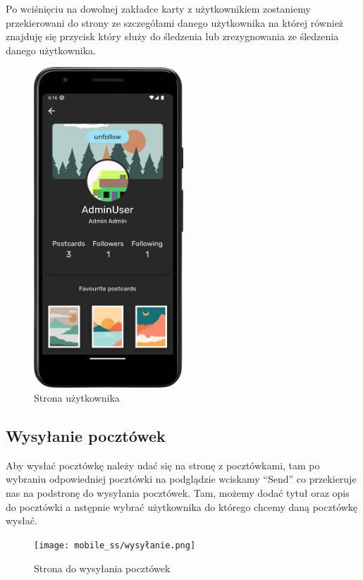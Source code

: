 \documentclass[a4paper,twoside,12pt]{book}
\begin{document}
Po wciśnięciu na dowolnej zakładce karty z użytkownikiem zostaniemy przekierowani do strony ze szczegółami danego użytkownika na której również znajduję się przycisk który służy do śledzenia lub zrezygnowania ze śledzenia danego użytkownika. 

\begin{figure}[H]
    \centering
    \includegraphics[width=0.5\textwidth]{mobile_ss/friend.png}
    \caption{Strona użytkownika}
\end{figure}

\subsection{Wysyłanie pocztówek}
Aby wysłać pocztówkę należy udać się na stronę z pocztówkami, tam po wybraniu odpowiedniej pocztówki na podglądzie wciskamy ``Send'' co przekieruje nas na podstronę do wysyłania pocztówek. Tam, możemy dodać tytuł oraz opis do pocztówki a nstępnie wybrać użytkownika do którego chcemy daną pocztówkę wysłać. 

\begin{figure}[H]
    \centering
    \texttt{[image: mobile\_ss/wysyłanie.png]}
    \caption{Strona do wysyłania pocztówek}
\end{figure}
\end{document}
